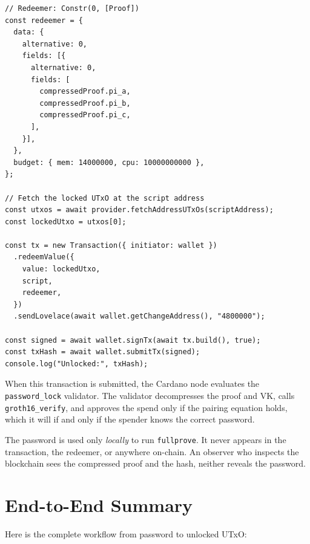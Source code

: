 \begin{verbatim}
// Redeemer: Constr(0, [Proof])
const redeemer = {
  data: {
    alternative: 0,
    fields: [{
      alternative: 0,
      fields: [
        compressedProof.pi_a,
        compressedProof.pi_b,
        compressedProof.pi_c,
      ],
    }],
  },
  budget: { mem: 14000000, cpu: 10000000000 },
};

// Fetch the locked UTxO at the script address
const utxos = await provider.fetchAddressUTxOs(scriptAddress);
const lockedUtxo = utxos[0];

const tx = new Transaction({ initiator: wallet })
  .redeemValue({
    value: lockedUtxo,
    script,
    redeemer,
  })
  .sendLovelace(await wallet.getChangeAddress(), "4800000");

const signed = await wallet.signTx(await tx.build(), true);
const txHash = await wallet.submitTx(signed);
console.log("Unlocked:", txHash);
\end{verbatim}

When this transaction is submitted, the Cardano node evaluates the
\texttt{password\_lock} validator. The validator decompresses the proof and VK,
calls \texttt{groth16\_verify}, and approves the spend only if the pairing
equation holds, which it will if and only if the spender knows the correct
password.

\begin{highlight}
The password is used only \emph{locally} to run \texttt{fullprove}. It never
appears in the transaction, the redeemer, or anywhere on-chain. An observer who
inspects the blockchain sees the compressed proof and the hash, neither
reveals the password.
\end{highlight}

\section{End-to-End Summary} \label{sec:ch6-summary}

Here is the complete workflow from password to unlocked UTxO:

